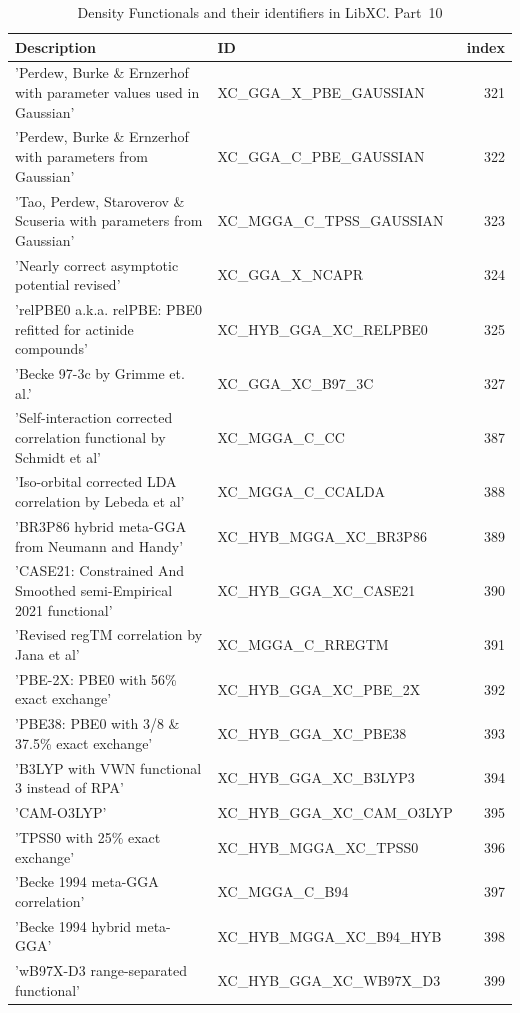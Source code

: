 \documentclass[final,12pt,makeidx,DIV=calc]{article}
\begin{document}
{{{\begin{table}[!h]
\caption{Density Functionals and their identifiers in LibXC. Part~10}
\begin{center}
\begin{tabular}{llr}
\hline
\hline
Description & ID & index\\
\hline
  'Perdew, Burke \& Ernzerhof with parameter values used in Gaussian' & XC\_GGA\_X\_PBE\_GAUSSIAN  &321\\
  'Perdew, Burke \& Ernzerhof with parameters from Gaussian' & XC\_GGA\_C\_PBE\_GAUSSIAN  &322\\
  'Tao, Perdew, Staroverov \& Scuseria with parameters from Gaussian' & XC\_MGGA\_C\_TPSS\_GAUSSIAN  &323\\
  'Nearly correct asymptotic potential revised' & XC\_GGA\_X\_NCAPR  &324\\
  'relPBE0 a.k.a. relPBE: PBE0 refitted for actinide compounds' & XC\_HYB\_GGA\_XC\_RELPBE0  &325\\
  'Becke 97-3c by Grimme et. al.' & XC\_GGA\_XC\_B97\_3C  &327\\
  'Self-interaction corrected correlation functional by Schmidt et al' & XC\_MGGA\_C\_CC  &387\\
  'Iso-orbital corrected LDA correlation by Lebeda et al' & XC\_MGGA\_C\_CCALDA  &388\\
  'BR3P86 hybrid meta-GGA from Neumann and Handy' & XC\_HYB\_MGGA\_XC\_BR3P86  &389\\
  'CASE21: Constrained And Smoothed semi-Empirical 2021 functional' & XC\_HYB\_GGA\_XC\_CASE21  &390\\
  'Revised regTM correlation by Jana et al' & XC\_MGGA\_C\_RREGTM  &391\\
  'PBE-2X: PBE0 with 56\% exact exchange' & XC\_HYB\_GGA\_XC\_PBE\_2X  &392\\
  'PBE38: PBE0 with 3/8 \& 37.5\% exact exchange' & XC\_HYB\_GGA\_XC\_PBE38  &393\\
  'B3LYP with VWN functional 3 instead of RPA' & XC\_HYB\_GGA\_XC\_B3LYP3  &394\\
  'CAM-O3LYP' & XC\_HYB\_GGA\_XC\_CAM\_O3LYP  &395\\
  'TPSS0 with 25\% exact exchange' & XC\_HYB\_MGGA\_XC\_TPSS0  &396\\
  'Becke 1994 meta-GGA correlation' & XC\_MGGA\_C\_B94  &397\\
  'Becke 1994 hybrid meta-GGA' & XC\_HYB\_MGGA\_XC\_B94\_HYB  &398\\
  'wB97X-D3 range-separated functional' & XC\_HYB\_GGA\_XC\_WB97X\_D3  &399\\

\end{tabular}
\end{center}
\end{table}}}}
\end{document}
